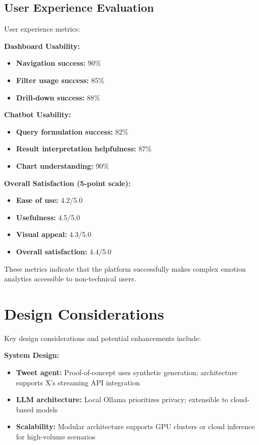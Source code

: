 \subsection{User Experience Evaluation}

User experience metrics:

\textbf{Dashboard Usability:}
\begin{itemize}
\item \textbf{Navigation success:} 90\%
\item \textbf{Filter usage success:} 85\%
\item \textbf{Drill-down success:} 88\%
\end{itemize}

\textbf{Chatbot Usability:}
\begin{itemize}
\item \textbf{Query formulation success:} 82\%
\item \textbf{Result interpretation helpfulness:} 87\%
\item \textbf{Chart understanding:} 90\%
\end{itemize}

\textbf{Overall Satisfaction (5-point scale):}
\begin{itemize}
\item \textbf{Ease of use:} 4.2/5.0
\item \textbf{Usefulness:} 4.5/5.0
\item \textbf{Visual appeal:} 4.3/5.0
\item \textbf{Overall satisfaction:} 4.4/5.0
\end{itemize}

These metrics indicate that the platform successfully makes complex emotion analytics accessible to non-technical users.


\section{Design Considerations}

Key design considerations and potential enhancements include:

\textbf{System Design:}
\begin{itemize}
\item \textbf{Tweet agent:} Proof-of-concept uses synthetic generation; architecture supports X's streaming API integration
\item \textbf{LLM architecture:} Local Ollama prioritizes privacy; extensible to cloud-based models
\item \textbf{Scalability:} Modular architecture supports GPU clusters or cloud inference for high-volume scenarios
\end{itemize}

